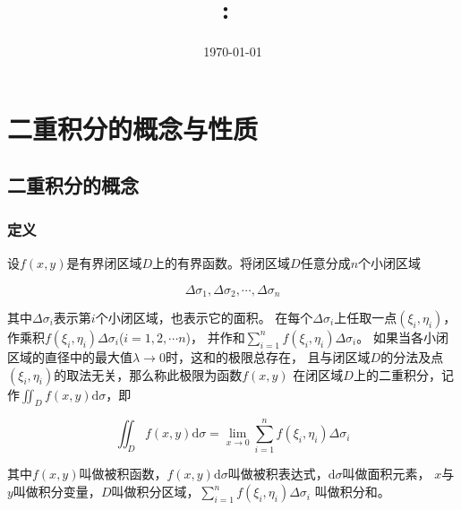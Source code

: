 \documentclass[12pt, a4paper]{article}
\title{
    \vspace{2in}
    \textmd{\textbf{\hmwkClass:\ \hmwkTitle}}\\
    \vspace{0.4in}
    \large{\textit{\myUniversiy}}
    \vspace{3in}
}
\author{\hmwkAuthorName}
\date{\today}
\numberwithin{equation}{section}
\newcommand{\rmd}{\mathrm{d}}
\begin{document}
\maketitle

\pagebreak


\tableofcontents

\pagebreak


\pagebreak

\section{二重积分的概念与性质}

\subsection{二重积分的概念}

\subsubsection{定义}

    设\(f\left(x,y\right)\)是有界闭区域\(D \)上的有界函数。将闭区域\(D \)任意分成\(n \)个小闭区域
    
    $$
        \Delta \sigma_1, \Delta \sigma_2, \cdots, \Delta \sigma_n
    $$

    其中\(\Delta \sigma_i \)表示第\(i \)个小闭区域，也表示它的面积。
    在每个\(\Delta \sigma_i\)上任取一点\(\left(\xi_i, \eta_i\right)\)，
    作乘积\(f\left(\xi_i, \eta_i \right)\Delta \sigma_i\)(\(i = 1, 2, \cdots n \))，
    并作和\({\displaystyle \sum_{i=1}^{n }f\left(\xi_i, \eta_i \right)\Delta \sigma_i}\)。
    如果当各小闭区域的直径中的最大值\(\lambda \rightarrow 0\)时，这和的极限总存在，
    且与闭区域\(D \)的分法及点\(\left(\xi_i, \eta_i\right)\)的取法无关，那么称此极限为函数\(f\left(x,y\right)\)
    在闭区域\(D \)上的二重积分，记作\({\displaystyle \iint_D f(x, y) \mathrm{d} \sigma}\)，即

    \begin{equation}
        \iint_D f(x, y) \mathrm{d} \sigma=\lim _{x \rightarrow 0} \sum_{i=1}^n f\left(\xi_i, \eta_i\right) \Delta \sigma_i
    \end{equation}

    其中\(f\left(x,y\right)\)叫做被积函数，\(f(x, y) \mathrm{d} \sigma\)叫做被积表达式，\(\rmd \sigma\)叫做面积元素，
    \(x \)与\(y \)叫做积分变量，\(D \)叫做积分区域，\({\displaystyle \sum_{i=1}^n f\left(\xi_i, \eta_i\right) \Delta \sigma_i}\)
    叫做积分和。
    \vspace{1em}
\end{document}
